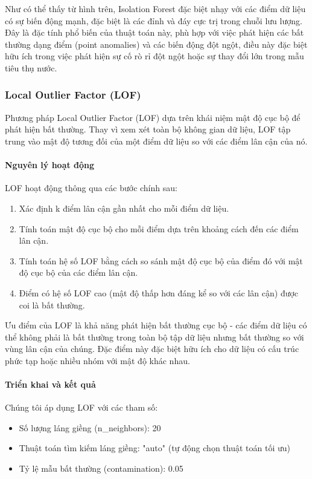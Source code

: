 Như có thể thấy từ hình trên, Isolation Forest đặc biệt nhạy với các điểm dữ liệu có sự biến động mạnh, đặc biệt là các đỉnh và đáy cực trị trong chuỗi lưu lượng. Đây là đặc tính phổ biến của thuật toán này, phù hợp với việc phát hiện các bất thường dạng điểm (point anomalies) và các biến động đột ngột, điều này đặc biệt hữu ích trong việc phát hiện sự cố rò rỉ đột ngột hoặc sự thay đổi lớn trong mẫu tiêu thụ nước.

\subsubsection{Local Outlier Factor (LOF)}

Phương pháp Local Outlier Factor (LOF) dựa trên khái niệm mật độ cục bộ để phát hiện bất thường. Thay vì xem xét toàn bộ không gian dữ liệu, LOF tập trung vào mật độ tương đối của một điểm dữ liệu so với các điểm lân cận của nó.

\paragraph{Nguyên lý hoạt động}
LOF hoạt động thông qua các bước chính sau:
\begin{enumerate}
    \item Xác định k điểm lân cận gần nhất cho mỗi điểm dữ liệu.
    \item Tính toán mật độ cục bộ cho mỗi điểm dựa trên khoảng cách đến các điểm lân cận.
    \item Tính toán hệ số LOF bằng cách so sánh mật độ cục bộ của điểm đó với mật độ cục bộ của các điểm lân cận.
    \item Điểm có hệ số LOF cao (mật độ thấp hơn đáng kể so với các lân cận) được coi là bất thường.
\end{enumerate}

Ưu điểm của LOF là khả năng phát hiện bất thường cục bộ - các điểm dữ liệu có thể không phải là bất thường trong toàn bộ tập dữ liệu nhưng bất thường so với vùng lân cận của chúng. Đặc điểm này đặc biệt hữu ích cho dữ liệu có cấu trúc phức tạp hoặc nhiều nhóm với mật độ khác nhau.

\paragraph{Triển khai và kết quả}
Chúng tôi áp dụng LOF với các tham số:
\begin{itemize}
    \item Số lượng láng giềng (n\_neighbors): 20
    \item Thuật toán tìm kiếm láng giềng: "auto" (tự động chọn thuật toán tối ưu)
    \item Tỷ lệ mẫu bất thường (contamination): 0.05
\end{itemize}

